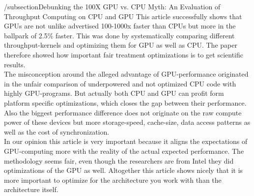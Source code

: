 /subsection{Debunking the 100X GPU vs. CPU Myth: An Evaluation of Throughput Computing on CPU and GPU}
This article successfully shows that GPUs are not unlike advertised 100-1000x faster than CPUs but more in the ballpark of 2.5\% faster. This was done by systematically comparing different throughput-kernels and optimizing them for GPU as well as CPU. The paper therefore showed how important fair treatment optimizations is to get scientific results.\\
The misconception around the alleged advantage of GPU-performance originated in the unfair comparison of underpowered and not optimized CPU code with highly GPU-programs. But actually both CPU and GPU can profit form platform specific optimizations, which closes the gap between their performance. Also the biggest performance difference does not originate on the raw compute power of these devices but more storage-speed, cache-size, data access patterns as well as the cost of synchronization.\\
In our opinion this article is very important because it aligns the expectations of GPU-computing more with the reality of the actual expected performance. The methodology seems fair, even though the researchers are from Intel they did optimizations of the GPU as well. Altogether this article shows nicely that it is more important to optimize for the architecture you work with than the architecture itself.
